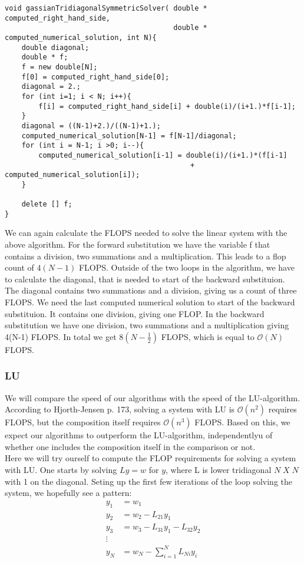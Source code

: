 \documentclass{article}
\begin{document}
\begin{lstlisting}
void gassianTridiagonalSymmetricSolver( double * computed_right_hand_side, 
										double * computed_numerical_solution, int N){
    double diagonal;
    double * f;
    f = new double[N];
    f[0] = computed_right_hand_side[0];
    diagonal = 2.;
    for (int i=1; i < N; i++){
        f[i] = computed_right_hand_side[i] + double(i)/(i+1.)*f[i-1];
    }
    diagonal = ((N-1)+2.)/((N-1)+1.);
    computed_numerical_solution[N-1] = f[N-1]/diagonal;
    for (int i = N-1; i >0; i--){
        computed_numerical_solution[i-1] = double(i)/(i+1.)*(f[i-1] 
        									+ computed_numerical_solution[i]);
    }

    delete [] f;
}
\end{lstlisting}

We can again calculate the FLOPS needed to solve the linear system with the above algorithm. For the forward substitution we have the variable f that contains a division, two summations and a multiplication. This leads to a flop count of $4(N-1)$ FLOPS. Outside of the two loops in the algorithm, we have to calculate the diagonal, that is needed to start of the backward substituion. The diagonal contains two summations and a division, giving us a count of three FLOPS. We need the last computed numerical solution to start of the backward substituion. It contains one division, giving one FLOP. In the backward substitution we have one division, two summations and a multiplication giving 4(N-1) FLOPS. In total we get $8(N-\frac{1}{2})$ FLOPS, which is equal to $\mathcal{O}(N)$ FLOPS. 

\subsubsection{LU}
We will compare the speed of our algorithms with the speed of the LU-algorithm. According to Hjorth-Jensen \cite{MHJ} p. 173, solving a system with LU is $\mathcal{O}(n^2)$ requires FLOPS, but the composition itself requires  $\mathcal{O}(n^3)$ FLOPS. Based on this, we expect our algorithms to outperform the LU-algorithm, independentlyu of whether one includes the composition itself in the comparison or not.\\

Here we will try ourself to compute the FLOP requirements for solving a system with LU. One starts by solving $Ly = w$ for $y$, where L is lower tridiagonal $N\; X\; N$ with 1 on the diagonal. Seting up the first few iterations of the loop solving the system, we hopefully see a pattern:
\begin{align}
y_1 &= w_1\\
y_2 &= w_2 - L_{21} y_1\\
y_3 &= w_3 - L_{31} y_1 - L_{32}y_2\\
\vdots\\
y_{N}& = w_N - \sum_{i=1}^{N} L_{Ni} y_i
\end{align}
\end{document}
